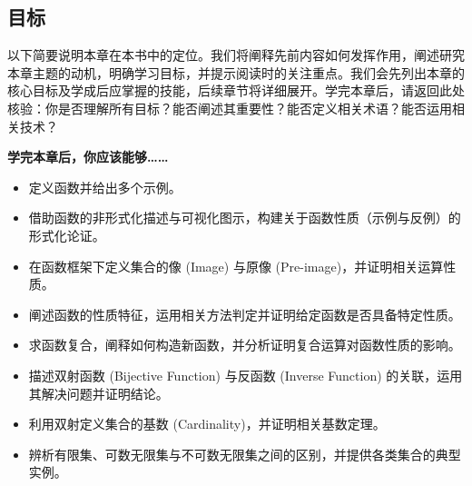 
\subsection{目标}

以下简要说明本章在本书中的定位。我们将阐释先前内容如何发挥作用，阐述研究本章主题的动机，明确学习目标，并提示阅读时的关注重点。我们会先列出本章的核心目标及学成后应掌握的技能，后续章节将详细展开。学完本章后，请返回此处核验：你是否理解所有目标？能否阐述其重要性？能否定义相关术语？能否运用相关技术？

\textbf{学完本章后，你应该能够……}

\begin{itemize}
    \item 定义函数并给出多个示例。
    \item 借助函数的非形式化描述与可视化图示，构建关于函数性质（示例与反例）的形式化论证。
    \item 在函数框架下定义集合的像 (Image) 与原像 (Pre-image)，并证明相关运算性质。
    \item 阐述函数的性质特征，运用相关方法判定并证明给定函数是否具备特定性质。
    \item 求函数复合，阐释如何构造新函数，并分析证明复合运算对函数性质的影响。
    \item 描述双射函数 (Bijective Function) 与反函数 (Inverse Function) 的关联，运用其解决问题并证明结论。
    \item 利用双射定义集合的基数 (Cardinality)，并证明相关基数定理。
    \item 辨析有限集、可数无限集与不可数无限集之间的区别，并提供各类集合的典型实例。
\end{itemize}